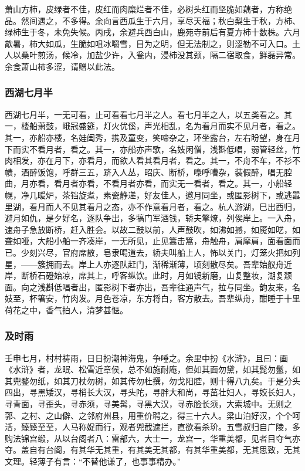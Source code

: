 \documentclass[]{article}
\begin{document}
萧山方柿，皮绿者不佳，皮红而肉糜烂者不佳，必树头红而坚脆如藕者，方称绝品。然间遇之，不多得。余向言西瓜生于六月，享尽天福；秋白梨生于秋，方柿、绿柿生于冬，未免失候。丙戌，余避兵西白山，鹿苑寺前后有夏方柿十数株。六月歊暑，柿大如瓜，生脆如咀冰嚼雪，目为之明，但无法制之，则涩勒不可入口。土人以桑叶煎汤，候冷，加盐少许，入瓮内，浸柿没其颈，隔二宿取食，鲜磊异常。余食萧山柿多涩，请赠以此法。

\hypertarget{header-n525}{%
\subsubsection{西湖七月半}\label{header-n525}}

西湖七月半，一无可看，止可看看七月半之人。看七月半之人，以五类看之。其一，楼船萧鼓，峨冠盛筵，灯火优傒，声光相乱，名为看月而实不见月者，看之。其一，亦船亦楼，名娃闺秀，携及童变，笑啼杂之，环坐露台，左右盼望，身在月下而实不看月者，看之。其一，亦船亦声歌，名妓闲僧，浅斟低唱，弱管轻丝，竹肉相发，亦在月下，亦看月，而欲人看其看月者，看之。其一，不舟不车，不衫不帻，酒醉饭饱，呼群三五，跻入人丛，昭庆、断桥，嘄呼嘈杂，装假醉，唱无腔曲，月亦看，看月者亦看，不看月者亦看，而实无一看者，看之。其一，小船轻幌，净几暖炉，茶铛旋煮，素瓷静递，好友佳人，邀月同坐，或匿影树下，或逃嚣里湖，看月而人不见其看月之态，亦不作意看月者，看之。杭人游湖，巳出酉归，避月如仇，是夕好名，逐队争出，多犒门军酒钱，轿夫擎燎，列俟岸上。一入舟，速舟子急放断桥，赶入胜会。以故二鼓以前，人声鼓吹，如沸如撼，如魇如呓，如聋如哑，大船小船一齐凑岸，一无所见，止见篙击篙，舟触舟，肩摩肩，面看面而已。少刻兴尽，官府席散，皂隶喝道去，轿夫叫船上人，怖以关门，灯笼火把如列星，------簇拥而去。岸上人亦逐队赶门，渐稀渐薄，顷刻散尽矣。吾辈始舣舟近岸，断桥石磴始凉，席其上，呼客纵饮。此时，月如镜新磨，山复整妆，湖复颒面。向之浅斟低唱者出，匿影树下者亦出，吾辈往通声气，拉与同坐。韵友来，名妓至，杯箸安，竹肉发。月色苍凉，东方将白，客方散去。吾辈纵舟，酣睡于十里荷花之中，香气拍人，清梦甚惬。

\hypertarget{header-n530}{%
\subsubsection{及时雨}\label{header-n530}}

壬申七月，村村祷雨，日日扮潮神海鬼，争唾之。余里中扮《水浒》，且曰：画《水浒》者，龙眠、松雪近章侯，总不如施耐庵，但如其面勿黛，如其髭勿鬣，如其兜鍪勿纸，如其刀杖勿树，如其传勿杜撰，勿戈阳腔，则十得八九矣。于是分头四出，寻黑矮汉，寻梢长大汉，寻头陀，寻胖大和尚，寻茁壮妇人，寻姣长妇人，寻青面，寻歪头，寻赤须，寻美髯，寻黑大汉，寻赤脸长须，大索城中。无则之郭、之村、之山僻、之邻府州县，用重价聘之，得三十六人。梁山泊好汉，个个呵活，臻臻至至，人马称娖而行，观者兜截遮拦，直欲看杀玠。五雪叔归自广陵，多购法锦宫缎，从以台阁者八：雷部六，大士一，龙宫一，华重美都，见者目夺气亦夺。盖自有台阁，有其华无其重，有其美无其都，有其华重美都，无其思致，无其文理。轻薄子有言：``不替他谦了，也事事精办。''
\end{document}
